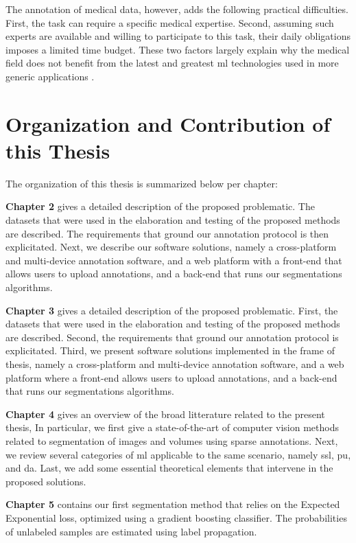 The annotation of medical data, however, adds the following practical difficulties.
First, the task can require a specific medical expertise.
Second, assuming such experts are available and willing to participate to this task, their daily obligations imposes a limited time budget.
These two factors largely explain why the medical field does not benefit from the latest and greatest \gls{ml} technologies used in more generic applications \cite{orting19}.


\section{Organization and Contribution of this Thesis}
The organization of this thesis is summarized below per chapter:

\textbf{Chapter 2} gives a detailed description of the proposed problematic.
The datasets that were used in the elaboration and testing of the proposed methods are described.
The requirements that ground our annotation protocol is then explicitated.
Next, we describe our software solutions, namely a cross-platform and multi-device annotation software, and a web platform with a front-end that allows users to upload annotations, and a back-end that runs our segmentations algorithms.

\textbf{Chapter 3} gives a detailed description of the proposed problematic.
First, the datasets that were used in the elaboration and testing of the proposed methods are described.
Second, the requirements that ground our annotation protocol is explicitated.
Third, we present software solutions implemented in the frame of thesis, namely a cross-platform and multi-device annotation software, and a web platform where a front-end allows users to upload annotations, and a back-end that runs our segmentations algorithms.

\textbf{Chapter 4} gives an overview of the broad litterature related to the present thesis,
In particular, we first give a state-of-the-art of computer vision methods related to segmentation of images and volumes using sparse annotations.
Next, we review several categories of \gls{ml} applicable to the same scenario, namely \gls{ssl}, \gls{pu}, and \gls{da}.
Last, we add some essential theoretical elements that intervene in the proposed solutions.

\textbf{Chapter 5} contains our first segmentation method that relies on the Expected Exponential loss, optimized using a gradient boosting classifier. The probabilities of unlabeled samples are estimated using label propagation.

